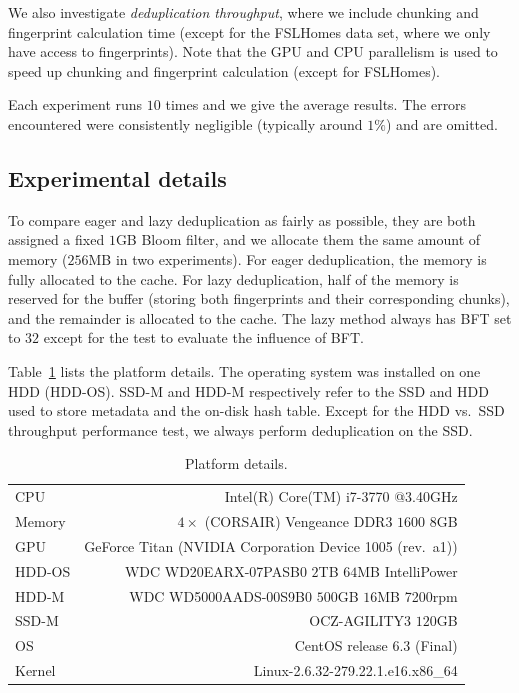 \documentclass[prodmode,acmtecs]{acmsmall}
\begin{document}
We also investigate \emph{deduplication throughput}, where we include chunking and fingerprint calculation time (except for the FSLHomes data set, where we only have access to fingerprints).  Note that the GPU and CPU parallelism is used to speed up chunking and fingerprint calculation (except for FSLHomes).


Each experiment runs $10$ times and we give the average results. The errors encountered were consistently negligible (typically around $1\%$) and are omitted.

\subsection{Experimental details}\label{se:exp_det}

To compare eager and lazy deduplication as fairly as possible, they are both assigned a fixed $1$GB Bloom filter, and we allocate them the same amount of memory ($256$MB in two experiments). For eager deduplication, the memory is fully allocated to the cache. For lazy deduplication, half of the memory is reserved for the buffer (storing both fingerprints and their corresponding chunks), and the remainder is allocated to the cache.  The lazy method always has BFT set to $32$ except for the test to evaluate the influence of BFT.

Table~\ref{tab:platform} lists the platform details. The operating system was installed on one HDD (HDD-OS). SSD-M and HDD-M respectively refer to the SSD and HDD used to store metadata and the on-disk hash table. Except for the HDD vs.\ SSD throughput performance test, we always perform deduplication on the SSD. 

\begin{table}[htbp]
    \centering
    \begin{tabular}{lr}
        \toprule
        CPU   & Intel(R) Core(TM) i7-3770 @3.40GHz \\
        Memory & $4 \times$ (CORSAIR) Vengeance DDR$3$ $1600$ $8$GB \\
        GPU & GeForce Titan (NVIDIA Corporation Device 1005 (rev.\ a1)) \\
        HDD-OS & WDC WD20EARX-07PASB0 $2$TB $64$MB IntelliPower \\
        HDD-M & WDC WD5000AADS-00S9B0 $500$GB $16$MB 7200rpm \\
        SSD-M & OCZ-AGILITY3 $120$GB \\
        OS & CentOS release 6.3 (Final) \\
        Kernel & Linux-2.6.32-279.22.1.e16.x86\_64 \\
        \bottomrule
    \end{tabular}
    \caption{Platform details.}
    \label{tab:platform}
\end{table}
\end{document}
